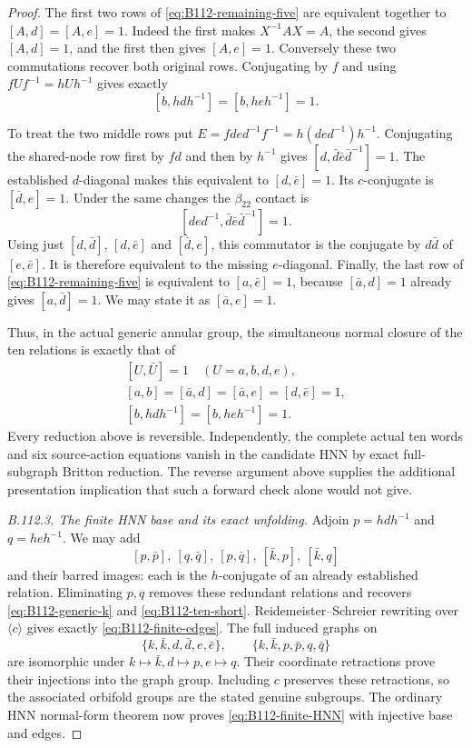 \begin{proof}
The first two rows of \eqref{eq:B112-remaining-five} are equivalent
together to $[A,d]=[A,e]=1$. Indeed the first makes
$X^{-1}AX=A$, the second gives $[A,d]=1$, and the first then gives
$[A,e]=1$. Conversely these two commutations recover both original
rows. Conjugating by $f$ and using
$fUf^{-1}=hUh^{-1}$ gives exactly
\begin{equation}\label{eq:B112-shift-pair}
 [b,hdh^{-1}]=[b,heh^{-1}]=1.
\end{equation}

To treat the two middle rows put
$E=fde d^{-1}f^{-1}=h(de d^{-1})h^{-1}$.
Conjugating the shared-node row first by $fd$ and then by $h^{-1}$
gives $[d,\bar d\bar e\bar d^{-1}]=1$.
The established $d$-diagonal makes this equivalent to
$[d,\bar e]=1$. Its $c$-conjugate is $[\bar d,e]=1$.
Under the same changes the $\beta_{22}$ contact is
\[
 [de d^{-1},\bar d\bar e\bar d^{-1}]=1.
\]
Using just $[d,\bar d]$, $[d,\bar e]$ and $[\bar d,e]$, this
commutator is the conjugate by $d\bar d$ of $[e,\bar e]$.
It is therefore equivalent to the missing $e$-diagonal. Finally,
the last row of \eqref{eq:B112-remaining-five} is equivalent to
$[a,\bar e]=1$, because $[\bar a,d]=1$ already gives
$[a,\bar d]=1$. We may state it as $[\bar a,e]=1$.

Thus, in the actual generic annular group, the simultaneous normal
closure of the ten relations is exactly that of
\begin{equation}\label{eq:B112-ten-short}
 \begin{gathered}
 [U,\bar U]=1\quad(U=a,b,d,e),\\
 [a,b]=[\bar a,d]=[\bar a,e]=[d,\bar e]=1,\\
 [b,hdh^{-1}]=[b,heh^{-1}]=1.
 \end{gathered}
\end{equation}
Every reduction above is reversible. Independently, the complete
actual ten words and six source-action equations vanish in the
candidate HNN by exact full-subgraph Britton reduction. The reverse
argument above supplies the additional presentation implication
that such a forward check alone would not give.

\emph{B.112.3. The finite HNN base and its exact unfolding.}
Adjoin $p=hdh^{-1}$ and $q=heh^{-1}$. We may add
\[
 [p,\bar p],\ [q,\bar q],\ [p,\bar q],\
 [\bar k,p],\ [\bar k,q]
\]
and their barred images: each is the $h$-conjugate of an already
established relation. Eliminating $p,q$ removes these redundant
relations and recovers \eqref{eq:B112-generic-k} and
\eqref{eq:B112-ten-short}. Reidemeister--Schreier rewriting over
$\langle c\rangle$ gives exactly
\eqref{eq:B112-finite-edges}. The full induced graphs on
\[
 \{k,\bar k,d,\bar d,e,\bar e\},\qquad
 \{k,\bar k,p,\bar p,q,\bar q\}
\]
are isomorphic under $k\mapsto\bar k,d\mapsto p,e\mapsto q$.
Their coordinate retractions prove their injections into the graph
group. Including $c$ preserves these retractions, so the associated
orbifold groups are the stated genuine subgroups. The ordinary HNN
normal-form theorem now proves \eqref{eq:B112-finite-HNN} with
injective base and edges.


\end{proof}
